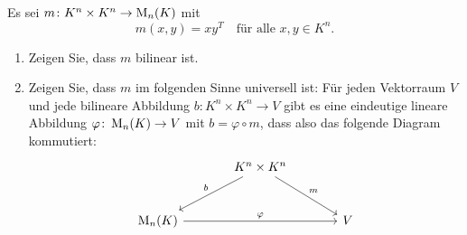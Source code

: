 \documentclass[a4paper,10pt]{scrartcl}
\begin{document}
\begin{question}
  Es sei $m \colon K^n \times K^n \to \operatorname{M}_n(K)$ mit
  \[
    m(x,y) = x y^T
    \quad
    \text{für alle $x,y \in K^n$}.
  \]
  \begin{enumerate}[leftmargin=*]
    \item
      Zeigen Sie, dass $m$ bilinear ist.
    \item
      Zeigen Sie, dass $m$ im folgenden Sinne universell ist:
      Für jeden Vektorraum $V$ und jede bilineare Abbildung $b \colon K^n \times K^n \to V$ gibt es eine eindeutige lineare Abbildung $\varphi \colon \operatorname{M}_n(K) \to V$ mit $b = \varphi \circ m$, dass also das folgende Diagram kommutiert:
      \[
        \begin{tikzcd}[row sep = large, column sep = large, ampersand replacement = \&]
              {}
          \&  K^n \times K^n  \arrow{rd}{m}
                              \arrow[swap]{ld}{b}
          \&  {}
          \\
              \Mat_n(K)       \arrow{rr}{\varphi}
          \&  {}
          \&  V
        \end{tikzcd}
      \]
  \end{enumerate}
\end{question}
\end{document}

